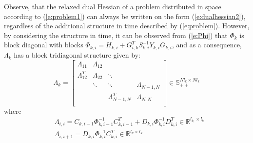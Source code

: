 \begin{remark}
Observe, that the relaxed dual Hessian of a problem distributed in space according to (\ref{e:problem1}) can always be written on the form (\ref{e:dualhessian2}), regardless of the additional structure in time described by (\ref{e:problem}). However, by considering the structure in time, it can be observed from (\ref{e:Phi}) that $\Phi_k$ is block diagonal with blocks $\Phi_{k,i} = H_{k,i} + G_{i,k}^T S_{k,i}^{-1} Y_{k,i} G_{k,i}$, and as a consequence, $\Lambda_k$ has a block tridiagonal structure given by:
\begin{equation}
\Lambda_k = \left[ \begin{array}{cccc} 
\Lambda_{11} &  \Lambda_{12} &   &  \\
\Lambda_{12}^T &  \Lambda_{22} & \ddots  &  \\
  &  \ddots & \ddots  & \Lambda_{N-1,N} \\
    &   & \Lambda_{N-1,N}^T  & \Lambda_{N,N} \\
\end{array} \right] \in \mathbb{S}_{++}^{N l_{k} \times N l_{k}}
\end{equation}
where
\begin{subequations}
\label{e:LambdaComponents}
\begin{align}
& \Lambda_{i,i} = C_{k,i-1}\Phi_{k,i-1}^{-1}C_{k,i-1}^T + D_{k,i}\Phi_{k,i}^{-1}D_{k,i}^T \in \mathbb{R}^{l_{k,} \times l_{k}} \\
& \Lambda_{i,i+1} = D_{k,i} \Phi_{k,i}^{-1}C_{k,i}^T \in \mathbb{R}^{l_{k} \times l_{k}}
\end{align}
\end{subequations}
\end{remark}

